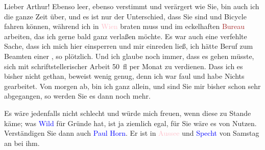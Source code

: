 \pstart
           Lieber Arthur! Ebenso leer, ebenso verstimmt und
               verärgert wie Sie, bin auch ich die ganze Zeit über, und es ist nur der Unterschied,
               dass Sie \label{K_L03123-1v}\label{K_L03123-1h} sind und Bicycle fahren können, während ich in \textcolor{pink}{Wien}{}\ledrightnote{\textcolor{pink}{Wien}} braten muss und im eckelhaften \textcolor{brown}{Bureau}{}\ledrightnote{{$\rightarrow$}\textcolor{brown}{»Phönix« Versicherung}} arbeiten, das ich gerne bald ganz
               verlaßen möchte. Es war auch eine verfehlte Sache, dass ich mich hier einsperren und
               mir einreden ließ, ich hätte Beruf zum Beamten einer \label{K_L03123-2v}\label{K_L03123-2h}, so
               plötzlich. Und ich glaube noch immer, dass es gehen müsste, sich mit
               schriftstellerischer {\pb}Arbeit 50 fl
               per Monat zu verdienen. Dass ich es bisher nicht gethan, beweist wenig genug, denn
               ich war faul und habe Nichts gearbeitet. Von morgen
               ab, bin ich ganz allein, und sind Sie mir bisher schon sehr abgegangen, so werden Sie
               es dann noch mehr.\pend
           
\pstart
           Es wäre jedenfalls nicht schlecht und würde mich freuen, wenn diese \label{K_L03123-3v}\label{K_L03123-3h} zu
               Stande käme; was \textcolor{blue}{Wild}{}\ledrightnote{\textcolor{blue}{Ignaz Wild}} für Gründe hat, ist ja ziemlich egal, für
               Sie wäre es von Nutzen. Verständigen Sie dann auch \textcolor{blue}{Paul Horn}{}\ledrightnote{\textcolor{blue}{Paul Horn}}. Er ist in \textcolor{pink}{Aussee}{}\ledrightnote{\textcolor{pink}{Bad Aussee}} und \textcolor{blue}{Specht}{}\ledrightnote{\textcolor{blue}{Richard Specht}} von Samstag an bei ihm.\pend
           
